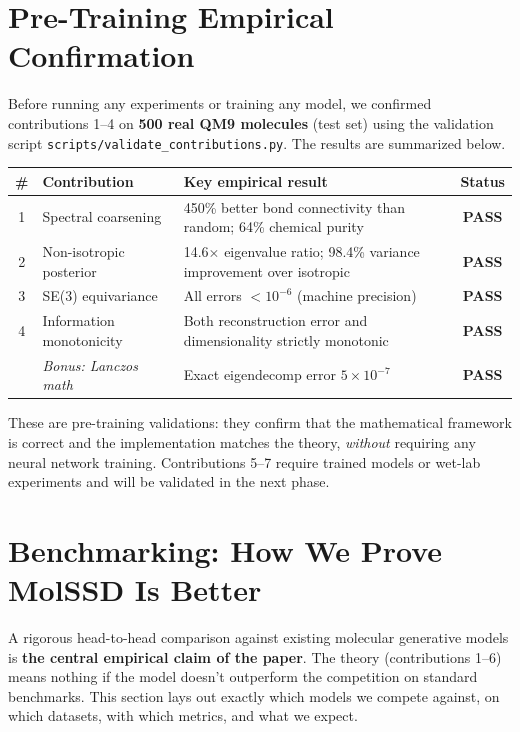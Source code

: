 \documentclass[12pt,a4paper]{article}
\begin{document}
\section{Pre-Training Empirical Confirmation}

Before running any experiments or training any model, we confirmed contributions 1--4 on \textbf{500 real QM9 molecules} (test set) using the validation script \texttt{scripts/validate\_contributions.py}. The results are summarized below.

\begin{center}
\renewcommand{\arraystretch}{1.3}
\begin{tabular}{clp{5cm}c}
\toprule
\textbf{\#} & \textbf{Contribution} & \textbf{Key empirical result} & \textbf{Status} \\
\midrule
1 & Spectral coarsening & 450\% better bond connectivity than random; 64\% chemical purity & \textbf{PASS} \\
2 & Non-isotropic posterior & 14.6$\times$ eigenvalue ratio; 98.4\% variance improvement over isotropic & \textbf{PASS} \\
3 & SE(3) equivariance & All errors $< 10^{-6}$ (machine precision) & \textbf{PASS} \\
4 & Information monotonicity & Both reconstruction error and dimensionality strictly monotonic & \textbf{PASS} \\
\midrule
& \textit{Bonus: Lanczos math} & Exact eigendecomp error $5 \times 10^{-7}$ & \textbf{PASS} \\
\bottomrule
\end{tabular}
\end{center}

These are pre-training validations: they confirm that the mathematical framework is correct and the implementation matches the theory, \emph{without} requiring any neural network training. Contributions 5--7 require trained models or wet-lab experiments and will be validated in the next phase.


\section{Benchmarking: How We Prove MolSSD Is Better}

A rigorous head-to-head comparison against existing molecular generative models is \textbf{the central empirical claim of the paper}. The theory (contributions 1--6) means nothing if the model doesn't outperform the competition on standard benchmarks. This section lays out exactly which models we compete against, on which datasets, with which metrics, and what we expect.
\end{document}
